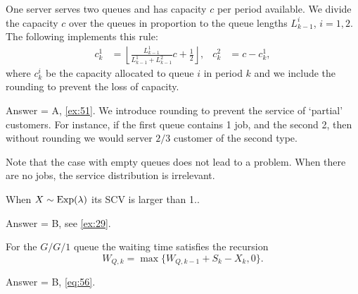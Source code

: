 \begin{exercise}[201904, 1]
  One server serves two queues and has capacity $c$ per period available.
  We divide the capacity $c$ over the queues in proportion to the queue lengths $L^i_{k-1}$, $i=1,2$.
  The following implements this rule:
    \begin{align*}
      c_k^1 &= \left\lfloor \frac{L_{k-1}^1}{L_{k-1}^1 + L_{k-1}^2} c + \frac 1 2 \right\rfloor, & c_k^2 &= c - c_k^1,
    \end{align*}
    where $c_k^i$ be the capacity allocated to queue $i$ in period $k$ and we include the rounding to prevent the loss of capacity.

\begin{solution}
      Answer = A, \ref{ex:51}.
      We introduce rounding to prevent the service of `partial' customers.
      For instance, if the first queue contains 1 job, and the second 2, then without rounding we would server $2/3$ customer of the second type.

      Note that the case with empty queues does not lead to a problem.
      When there are no jobs, the service distribution is irrelevant.
\end{solution}
\end{exercise}


\begin{exercise}[201904, 1]
When  $X\sim\operatorname{Exp}(\lambda)$ its SCV is larger than 1..
\begin{solution} Answer = B, see \ref{ex:29}.
\end{solution}
\end{exercise}

\begin{exercise}[201904, 1]
  For the $G/G/1$ queue the waiting time satisfies the recursion
  \begin{equation*}
  W_{Q,k} = \max\{W_{Q,k-1} + S_{k}-X_k, 0\}.
  \end{equation*}
\begin{solution} Answer = B, \eqref{eq:56}.
\end{solution}
\end{exercise}

